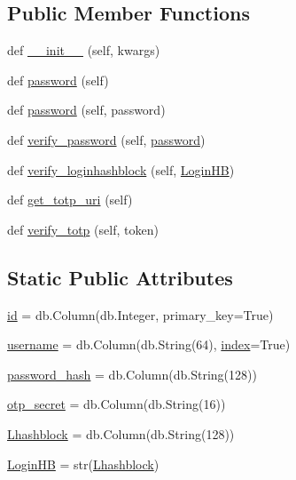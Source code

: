 \subsection*{Public Member Functions}
\begin{DoxyCompactItemize}
\item 
def \hyperlink{classmain_1_1User_ad8e260b3a15f0c0e77c7df7a68d8fcc7}{\+\_\+\+\_\+init\+\_\+\+\_\+} (self, kwargs)
\item 
def \hyperlink{classmain_1_1User_a0086c67911212cc60a39df0424fff2f8}{password} (self)
\item 
def \hyperlink{classmain_1_1User_a5fac9e642b0afaee7e29ddb94e2f1c3e}{password} (self, password)
\item 
def \hyperlink{classmain_1_1User_a8acfe5aa75f7a958346bcb2d156586d9}{verify\+\_\+password} (self, \hyperlink{classmain_1_1User_a0086c67911212cc60a39df0424fff2f8}{password})
\item 
def \hyperlink{classmain_1_1User_a147049a30fbe51d6192d320aa3ea5409}{verify\+\_\+loginhashblock} (self, \hyperlink{classmain_1_1User_aece6256cb85b54493c6d05185f112716}{Login\+HB})
\item 
def \hyperlink{classmain_1_1User_a8b69af8d948dbe7698c904bf94c6ac21}{get\+\_\+totp\+\_\+uri} (self)
\item 
def \hyperlink{classmain_1_1User_a390f1500b4c2fe34d0ba3cf8d1d54906}{verify\+\_\+totp} (self, token)
\end{DoxyCompactItemize}
\subsection*{Static Public Attributes}
\begin{DoxyCompactItemize}
\item 
\hyperlink{classmain_1_1User_af213bc1240b634425b1b571d6bccc561}{id} = db.\+Column(db.\+Integer, primary\+\_\+key=True)
\item 
\hyperlink{classmain_1_1User_afc469a49c408f90fb653d979d2669f62}{username} = db.\+Column(db.\+String(64), \hyperlink{classmain_1_1index}{index}=True)
\item 
\hyperlink{classmain_1_1User_a4bd5dd61d9eca670b326c87ec7f79f94}{password\+\_\+hash} = db.\+Column(db.\+String(128))
\item 
\hyperlink{classmain_1_1User_a2a7a2d67099632b248ad93661e9733d2}{otp\+\_\+secret} = db.\+Column(db.\+String(16))
\item 
\hyperlink{classmain_1_1User_aa3b839482f4a293703c22ae82e9c639d}{Lhashblock} = db.\+Column(db.\+String(128))
\item 
\hyperlink{classmain_1_1User_aece6256cb85b54493c6d05185f112716}{Login\+HB} = str(\hyperlink{classmain_1_1User_aa3b839482f4a293703c22ae82e9c639d}{Lhashblock})
\end{DoxyCompactItemize}


